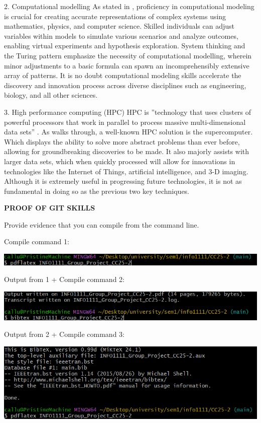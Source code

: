 \documentclass[a4paper, 11pt]{report}
\begin{document}
2. Computational modelling
As stated in \cite{compmodel}, proficiency in computational modeling is crucial for creating accurate representations of complex systems using mathematics, physics, and computer science. Skilled individuals can adjust variables within models to simulate various scenarios and analyze outcomes, enabling virtual experiments and hypothesis exploration. System thinking and the Turing pattern \cite{turing} emphasize the necessity of computational modelling, wherein minor adjustments to a basic formula can spawn an incomprehensibly extensive array of patterns. It is no doubt computational modeling skills accelerate the discovery and innovation process across diverse disciplines such as engineering, biology, and all other sciences. 

3. High performance computing (HPC)
HPC is ”technology that uses clusters of powerful processors that work in parallel to process massive multi-dimensional data sets” \cite{hpc2}. As \cite{hpc1} walks through, a well-known HPC solution is the supercomputer. Which displays the ability to solve more abstract problems than ever before, allowing for groundbreaking discoveries to be made.  It also majorly assists with larger data sets, which when quickly processed will allow for innovations in technologies like the Internet of Things, artificial intelligence, and 3-D imaging. Although it is extremely useful in progressing future technologies, it is not as fundamental in doing so as the previous two key techniques.

\textbf{PROOF OF GIT SKILLS}

Provide evidence that you can compile from the command line.

Compile command 1:

\includegraphics{Callum - compile command 1}


Output from 1 + Compile command 2:

\includegraphics{Callum - compile command 2 + output from 1}


Output from 2 + Compile command 3:

\includegraphics{Callum - compile command 3 + output from 2}
\end{document}
